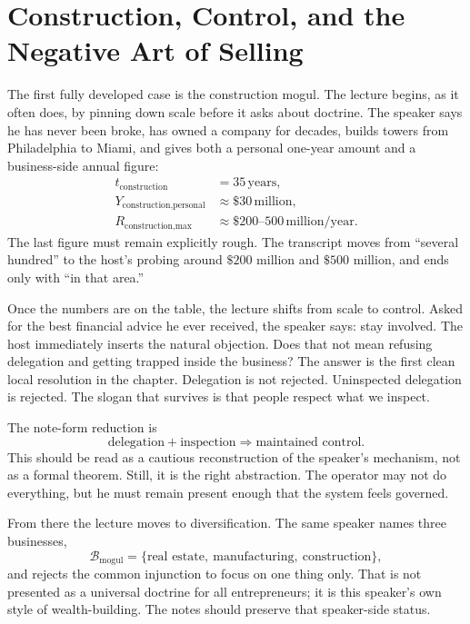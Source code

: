 \section{Construction, Control, and the Negative Art of Selling}

The first fully developed case is the construction mogul. The lecture begins, as it often does, by pinning down scale before it asks about doctrine. The speaker says he has never been broke, has owned a company for decades, builds towers from Philadelphia to Miami, and gives both a personal one-year amount and a business-side annual figure:
\begin{align}
t_{\text{construction}} &= 35\,\text{years},\\
Y_{\text{construction,personal}} &\approx \$30\,\text{million},\\
R_{\text{construction,max}} &\approx \$200\text{--}500\,\text{million/year}.
\end{align}
The last figure must remain explicitly rough. The transcript moves from ``several hundred'' to the host's probing around \(\$200\) million and \(\$500\) million, and ends only with ``in that area.''

Once the numbers are on the table, the lecture shifts from scale to control. Asked for the best financial advice he ever received, the speaker says: stay involved. The host immediately inserts the natural objection. Does that not mean refusing delegation and getting trapped inside the business? The answer is the first clean local resolution in the chapter. Delegation is not rejected. Uninspected delegation is rejected. The slogan that survives is that people respect what we inspect.

The note-form reduction is
\begin{equation}
\text{delegation} + \text{inspection} \Rightarrow \text{maintained control}.
\end{equation}
This should be read as a cautious reconstruction of the speaker's mechanism, not as a formal theorem. Still, it is the right abstraction. The operator may not do everything, but he must remain present enough that the system feels governed.

From there the lecture moves to diversification. The same speaker names three businesses,
\begin{equation}
\mathcal{B}_{\text{mogul}}
=
\{\text{real estate},\ \text{manufacturing},\ \text{construction}\},
\end{equation}
and rejects the common injunction to focus on one thing only. That is not presented as a universal doctrine for all entrepreneurs; it is this speaker's own style of wealth-building. The notes should preserve that speaker-side status.

